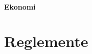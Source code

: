 \documentclass{article}
\begin{document}
\subsection{Ekonomi}






\clearpage
\part{Reglemente}
\end{document}
